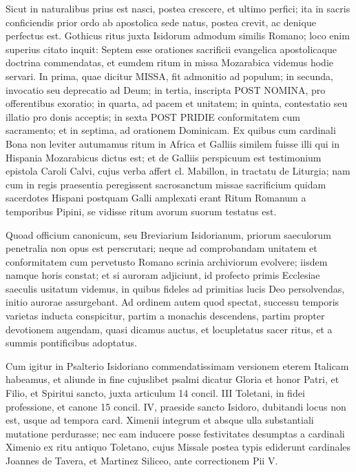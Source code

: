 \documentclass[letter,11pt]{book}
\begin{document}
Sicut in naturalibus prius est nasci, postea crescere, et ultimo perfici; ita in sacris conficiendis prior ordo ab apostolica sede natus, postea crevit, ac denique perfectus est. Gothicus ritus juxta Isidorum admodum similis Romano; loco enim superius citato inquit: Septem esse orationes sacrificii evangelica apostolicaque doctrina commendatas, et eumdem ritum in missa Mozarabica videmus hodie servari. In prima, quae dicitur MISSA, fit admonitio ad populum; in secunda, invocatio seu deprecatio ad Deum; in tertia, inscripta POST NOMINA, pro offerentibus exoratio; in quarta, ad pacem et unitatem; in quinta, contestatio seu illatio pro donis acceptis; in sexta POST PRIDIE conformitatem cum sacramento; et in septima, ad orationem Dominicam. Ex quibus cum cardinali Bona non leviter autumamus ritum in Africa et Galliis similem fuisse illi qui in Hispania Mozarabicus dictus est; et de Galliis perspicuum est testimonium epistola Caroli Calvi, cujus verba affert cl. Mabillon, in tractatu de Liturgia; nam cum in regis praesentia peregissent sacrosanctum missae sacrificium quidam sacerdotes Hispani postquam Galli amplexati erant Ritum Romanum a temporibus Pipini, se vidisse ritum avorum suorum testatus est.

Quoad officium canonicum, seu Breviarium Isidorianum, priorum saeculorum penetralia non opus est perscrutari; neque ad comprobandam unitatem et conformitatem cum pervetusto Romano scrinia archiviorum evolvere; iisdem namque horis constat; et si auroram adjiciunt, id profecto primis Ecclesiae saeculis usitatum videmus, in quibus fideles ad primitias lucis Deo persolvendas, initio aurorae assurgebant. Ad ordinem autem quod spectat, successu temporis varietas inducta conspicitur, partim a monachis descendens, partim propter devotionem augendam, quasi dicamus auctus, et locupletatus sacer ritus, et a summis pontificibus adoptatus.

Cum igitur in Psalterio Isidoriano commendatissimam versionem eterem Italicam habeamus, et aliunde in fine cujuslibet psalmi dicatur Gloria et honor Patri, et Filio, et Spiritui sancto, juxta articulum 14 concil. III Toletani, in fidei professione, et canone 15 concil. IV, praeside sancto Isidoro, dubitandi locus non est, usque ad tempora card. Ximenii integrum et absque ulla substantiali mutatione perdurasse; nec eam inducere posse festivitates desumptas a cardinali Ximenio ex ritu antiquo Toletano, cujus Missale postea typis ediderunt cardinales Joannes de Tavera, et Martinez Siliceo, ante correctionem Pii V.
\end{document}
